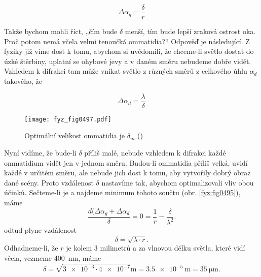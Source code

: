     \begin{equation}\label{fyz:eq682}
      \Delta\alpha_g = \frac{\delta}{r}
    \end{equation}

    Takže bychom mohli říct, „čím bude \(\delta\) menší, tím bude lepší zraková ostrost oka. Proč
    potom nemá včela velmi tenoučká ommatidia?“ Odpověď je následující. Z fyziky již víme dost k
    tomu, abychom si uvědomili, že chceme-li světlo dostat do úzké štěrbiny, uplatní se ohybové jevy
    a v daném směru nebudeme dobře vidět. Vzhledem k difrakci tam může vnikat světlo z různých směrů
    z celkového úhlu \(\alpha_d\) takového, že
    
    \begin{equation}\label{fyz:eq587}
      \Delta\alpha_d = \frac{\lambda}{\delta}
    \end{equation}    

    \begin{figure}[ht!] %
      \centering
      \texttt{[image: fyz\_fig0497.pdf]}
      \caption{Optimální velikost ommatidia je \(\delta_m\) (\cite[s.~697]{Feynman01})}
      \label{fyz:fig0497}
    \end{figure}

    Nyní vidíme, že bude-li \(\delta\) příliš malé, nebude vzhledem k difrakci každé ommatidium
    vidět jen v jednom směru. Budou-li ommatidia příliš velká, uvidí každé v určitém směru, ale
    nebude jich dost k tomu, aby vytvořily dobrý obraz dané scény. Proto vzdálenost \(\delta\)
    nastavíme tak, abychom optimalizovali vliv obou účinků. Sečteme-li je a najdeme minimum tohoto
    součtu (obr. \ref{fyz:fig0495}), máme
    \begin{equation}\label{fyz:eq588}
      \frac{d(\Delta\alpha_g + \Delta\alpha_d}{\delta} = 0 = \frac{1}{r} - \frac{\delta}{\lambda^2}.
    \end{equation}     
    odtud plyne vzdálenost
    \begin{equation}\label{fyz:eq589}
      \delta = \sqrt{\lambda\cdot r}.
    \end{equation} 
    Odhadneme-li, že \(r\) je kolem 3 milimetrů a za vlnovou délku světla, které vidí včela, vezmeme
    \SI{400}{\nm}, máme
    \begin{equation}\label{fyz:eq590}
      \delta = \sqrt{\num{3e-3}\cdot\num{4e-7}}\si{\m} = \SI{3.5e-5}{\m} = \SI{35}{\micro\m}.
    \end{equation} 

